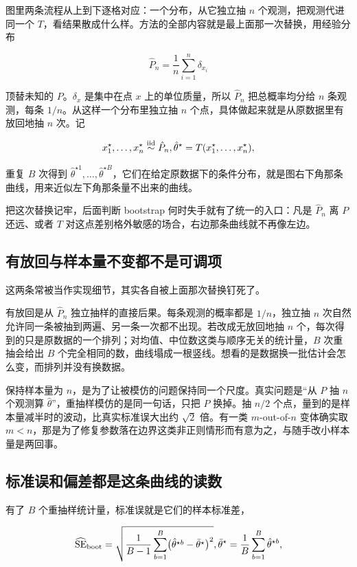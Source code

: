 图里两条流程从上到下逐格对应：一个分布，从它独立抽 \(n\) 个观测，把观测代进同一个 \(T\)，看结果散成什么样。方法的全部内容就是最上面那一次替换，用经验分布

\[
\hat P_n=\frac1n\sum_{i=1}^n\delta_{x_i}
\]

顶替未知的 \(P\)。\(\delta_x\) 是集中在点 \(x\) 上的单位质量，所以 \(\hat P_n\) 把总概率均分给 \(n\) 条观测，每条 \(1/n\)。从这样一个分布里独立抽 \(n\) 个点，具体做起来就是从原数据里有放回地抽 \(n\) 次。记

\[
x_1^\star,\ldots,x_n^\star\overset{\mathrm{iid}}{\sim}\hat P_n,
\space
\hat\theta^\star=T(x_1^\star,\ldots,x_n^\star),
\]

重复 \(B\) 次得到 \(\hat\theta^{\star1},\ldots,\hat\theta^{\star B}\)，它们在给定原数据下的条件分布，就是图右下角那条曲线，用来近似左下角那条量不出来的曲线。

把这次替换记牢，后面判断 bootstrap 何时失手就有了统一的入口：凡是 \(\hat P_n\) 离 \(P\) 还远、或者 \(T\) 对这点差别格外敏感的场合，右边那条曲线就不再像左边。

\subsection{有放回与样本量不变都不是可调项}

这两条常被当作实现细节，其实各自被上面那次替换钉死了。

有放回是从 \(\hat P_n\) 独立抽样的直接后果。每条观测的概率都是 \(1/n\)，独立抽 \(n\) 次自然允许同一条被抽到两遍、另一条一次都不出现。若改成无放回地抽 \(n\) 个，每次得到的只是原数据的一个排列；对均值、中位数这类与顺序无关的统计量，\(B\) 次重抽会给出 \(B\) 个完全相同的数，曲线塌成一根竖线。想看的是数据换一批估计会怎么变，而排列并没有换数据。

保持样本量为 \(n\)，是为了让被模仿的问题保持同一个尺度。真实问题是``从 \(P\) 抽 \(n\) 个观测算 \(\hat\theta\)''，重抽样模仿的是同一句话，只把 \(P\) 换掉。抽 \(n/2\) 个点，量到的是样本量减半时的波动，比真实标准误大出约 \(\sqrt2\) 倍。有一类 \(m\)-out-of-\(n\) 变体确实取 \(m<n\)，那是为了修复参数落在边界这类非正则情形而有意为之，与随手改小样本量是两回事。

\subsection{标准误和偏差都是这条曲线的读数}

有了 \(B\) 个重抽样统计量，标准误就是它们的样本标准差，

\[
\widehat{\operatorname{SE}}_{\mathrm{boot}}
=\sqrt{\frac1{B-1}\sum_{b=1}^B\bigl(\hat\theta^{\star b}-\bar\theta^\star\bigr)^2},
\space
\bar\theta^\star=\frac1B\sum_{b=1}^B\hat\theta^{\star b},
\]

